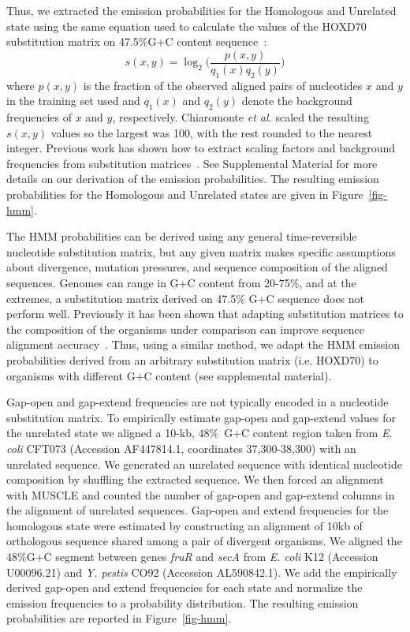 \documentclass[12pt,journal,letterpaper,onecolumn, draftcls]{IEEEtran}
\begin{document}
Thus, we extracted the emission probabilities for the
Homologous and Unrelated state using the same equation used to
calculate the values of the HOXD70 substitution matrix on 47.5\%G+C
content sequence~\cite{hoxd}:
\begin{equation}
s(x,y)= \log_{2}{\Bigg(\frac{p(x,y)}{q_{1}(x)q_{2}(y)}\Bigg)}
\label{eq-hoxd}
\end{equation}
{w}here $p(x,y)$ is the fraction of the observed aligned pairs of
nucleotides $x$ and $y$ in the training set used and $q_{1}(x)$ and
$q_{2}(y)$ denote the background frequencies of $x$ and $y$,
respectively. Chiaromonte \textit{et al.} scaled the resulting
$s(x,y)$ values so the largest was 100,
with the rest rounded to the nearest integer.  Previous work
has shown how to extract scaling factors and background frequencies from substitution matrices~\cite{ref-rev3a}. See Supplemental Material for
more details on our derivation of the emission probabilities. The resulting emission
probabilities for the Homologous and Unrelated states are given
in Figure~\ref{fig-hmm}.


The HMM probabilities can be derived using any general time-reversible nucleotide substitution matrix,
but any given matrix makes specific assumptions about divergence, mutation pressures,
and sequence composition of the aligned sequences.
Genomes can range in G+C content from 20-75\%, and at the extremes,
a substitution matrix derived on 47.5\% G+C sequence does not
perform well. Previously it has been shown that adapting substitution matrices to the composition
of the organisms under comparison can improve sequence alignment accuracy~\cite{ref-rev3a,ref-rev3b}. Thus, using a similar  method, we adapt the HMM emission
probabilities derived from an arbitrary substitution  matrix (i.e. HOXD70)
to organisms with different G+C content (see supplemental material).

Gap-open and gap-extend frequencies are not typically encoded in a nucleotide substitution matrix.  To empirically estimate gap-open and gap-extend values
for the unrelated state we aligned a 10-kb, 48\%~G+C content region
taken from \emph{E. coli} CFT073 (Accession AF447814.1, coordinates
37,300-38,300) with an unrelated sequence.  We generated an unrelated
sequence with identical nucleotide composition by shuffling the extracted sequence.  We then forced an
alignment with MUSCLE and counted the number of gap-open and gap-extend
columns in the alignment of unrelated sequences.  Gap-open and
extend frequencies for the homologous state were estimated by
constructing an alignment of 10kb of orthologous sequence shared among
a pair of divergent organisms.  We aligned the 48\%G+C segment between
genes \textit{fruR} and \textit{secA} from \textit{E. coli} K12
(Accession U00096.21) and \emph{Y. pestis} CO92 (Accession
AL590842.1). We add the empirically derived gap-open and extend
frequencies for each state and normalize the emission frequencies to a
probability distribution.  The resulting emission probabilities are
reported in Figure~\ref{fig-hmm}.
\end{document}
